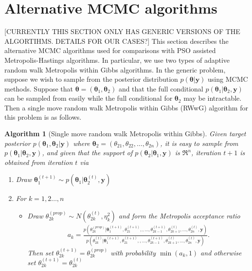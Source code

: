 \documentclass[12pt]{article}
\newtheorem{alg}{Algorithm}
\begin{document}
\section{Alternative MCMC algorithms}\label{sec:altmcmc}
[CURRENTLY THIS SECTION ONLY HAS GENERIC VERSIONS OF THE ALGORTIHMS. DETAILS FOR OUR CASES?]
This section describes the alternative MCMC algorithms used for comparisons with PSO assisted Metropolis-Hastings algorithms. In particular, we use two types of adaptive random walk Metropolis within Gibbs algorithms. In the generic problem, suppose we wish to sample from the posterior distribution $p(\bm{\theta}|\bm{y})$ using MCMC methods. Suppose that $\bm{\theta} = (\bm{\theta}_1, \bm{\theta}_2)$ and that the full conditional $p(\bm{\theta}_1|\bm{\theta}_2, \bm{y})$ can be sampled from easily while the full conditional for $\bm{\theta}_2$ may be intractable. Then a single move random walk Metropolis within Gibbs (RWwG) algorithm for this problem is as follows.
\begin{alg}[Single move random walk Metropolis within Gibbs]\label{alg:RWwG}
Given target posterior $p(\bm{\theta}_1,\bm{\theta}_2|\bm{y})$ where $\bm{\theta}_2=(\theta_{21},\theta_{22},\dots,\theta_{2n})$, it is easy to sample from $p(\bm{\theta}_1|\bm{\theta}_2,\bm{y})$, and given that the support of $p(\bm{\theta}_{2}|\bm{\theta}_1,\bm{y})$ is $\Re^n$, iteration $t+1$ is obtained from iteration $t$ via
\begin{enumerate}
\item Draw $\bm{\theta}_1^{(t+1)} \sim p(\bm{\theta}_1|\bm{\theta}_2^{(t)},\bm{y})$
\item For $k=1,2\dots,n$
\begin{itemize}
\item[] Draw $\theta_{2k}^{(prop)} \sim N(\theta_{2k}^{(t)}, \eta_k^2)$ and form the Metropolis acceptance ratio
\begin{align*}
a_k = \frac{p(\theta_{2k}^{(prop)}|\bm{\theta}_1^{(t+1)},\theta_{21}^{(t+1)},,\dots,\theta_{2k-1}^{(t+1)},\theta_{2k+1}^{(t)},\dots,\theta_{2n}^{(t)},\bm{y})}{p(\theta_{2k}^{(t)}|\bm{\theta}_1^{(t+1)},\theta_{21}^{(t+1)},,\dots,\theta_{2k-1}^{(t+1)},\theta_{2k+1}^{(t)},\dots,\theta_{2n}^{(t)},\bm{y})}.
\end{align*}
Then set $\theta_{2k}^{(t+1)}=\theta_{2k}^{(prop)}$ with probability $\min(a_k, 1)$ and otherwise set $\theta_{2k}^{(t+1)} = \theta_{2k}^{(t)}$
\end{itemize}
\end{enumerate}
\end{alg}
\end{document}
